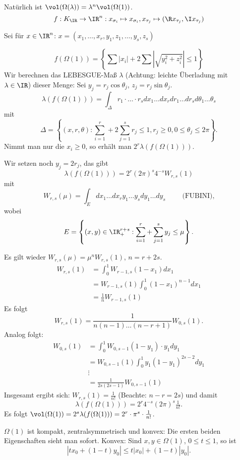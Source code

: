 \begin{Beweis}
 Natürlich ist $\vol(\Omega(\lambda))=\lambda^n\vol(\Omega(1))$.
 \[f: K_\IR \rightarrow \IR^n: x_{\sigma_i}\mapsto x_{\sigma_i}, x_{\tau_j}\mapsto (\R x_{\tau_j},\I x_{\tau_j})\]
 
 Sei für $x\in \IR^n$: $x=(x_1,\ldots,x_r,y_1,z_1,\ldots,y_s,z_s)$
 
 \[f(\Omega(1))=\left\{ \sum |x_i| + 2\sum |\sqrt{y_i^2+z_i^2}|\leq 1\right\}\]
 Wir berechnen das LEBESGUE-Maß $\lambda$ (Achtung: leichte Überladung mit $\lambda\in\IR$) dieser Menge: Sei $y_j=r_j\cos\theta_j$, $z_j=r_j\sin\theta_j$.
 \[ \lambda(f(\Omega(1)))=\int_{\Delta}r_1\cdot\ldots\cdot r_s dx_1\ldots dx_r dr_1\ldots dr_s d\theta_1\ldots \theta_s\]
 mit 
 \[ \Delta=\left\{(x,r,\theta): \sum_{i=1}^r + 2\sum_{j=1}^sr_j\leq 1, r_j\geq 0, 0\leq\theta_j\leq 2\pi\right\}.\]
 Nimmt man nur die $x_i\geq 0$, so erhält man $2^r\lambda(f(\Omega(1)))$.
 
 Wir setzen noch $y_j=2r_j$, das gibt \[ \lambda(f(\Omega(1)))=2^r(2\pi)^s4^{-s} W_{r,s}(1)\]
 mit \[ W_{r,s}(\mu)=\int_E dx_1\ldots dx_r y_1\ldots y_s dy_1\ldots dy_s \hspace{1cm} \text{(FUBINI),}\]
 wobei \[ E=\left\{ (x,y)\in\IR_+^{r+s}: \sum_{i=1}^r+\sum_{j=1}^s y_j\leq \mu\right\}.\]
 
 Es gilt wieder $W_{r,s}(\mu)=\mu^nW_{r,s}(1)$, $n=r+2s$.
 \begin{align*}
  W_{r,s}(1)&=\int_0^1W_{r-1,s}(1-x_1) dx_1\\
  &=W_{r-1,s}(1) \int_0^1 (1-x_1)^{n-1} dx_1\\
  &=\frac{1}{n} W_{r-1,s}(1)
 \end{align*}
 Es folgt \[ W_{r,s}(1)=\frac{1}{n(n-1)\ldots(n-r+1)}W_{0,s}(1).\]
 Analog folgt:
 \begin{align*}
  W_{0,s}(1)&=\int_0^1 W_{0,s-1}(1-y_1)\cdot y_1 dy_1\\
  &= W_{0,s-1}(1) \int_0^1 y_1(1-y_1)^{2s-2} dy_1\\
  & \vdots\\
  &=\frac{1}{2s(2s-1)} W_{0,s-1}(1)
 \end{align*}
Insgesamt ergibt sich: $W_{r,s}(1)=\frac{1}{n!}$ (Beachte: $n-r=2s$) und damit 
\[ \lambda(f(\Omega(1)))=2^r4^{-s}(2\pi)^s\tfrac{1}{n!}.\]
Es folgt $\vol(\Omega(1))=2^s\lambda(f(\Omega(1)))=2^r\cdot\pi^s\cdot \frac{1}{n!}$.
\end{Beweis}


\begin{Bemerkung}
 $\Omega(1)$ ist kompakt, zentralsymmetrisch und konvex: Die ersten beiden Eigenschaften sieht man sofort. Konvex: Sind $x,y\in\Omega(1)$, $0\leq t\leq 1$, so ist 
 \[ |tx_0+(1-t)y_0|\leq t|x_0|+(1-t)|y_0|.\]
\end{Bemerkung}

